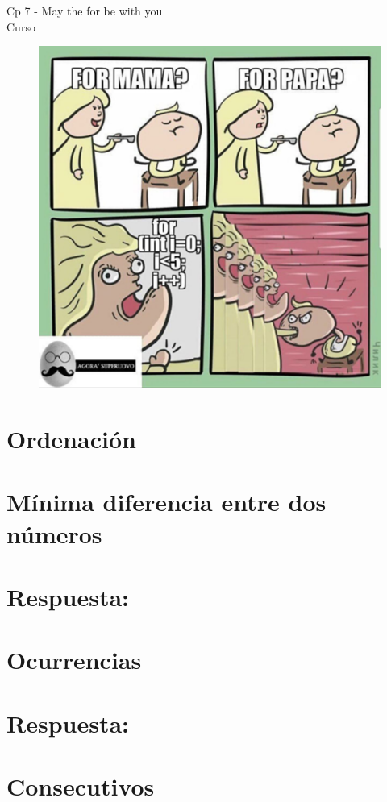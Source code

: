 \begin{center}
    \begin{large}
    Cp 7 - May the for be with you\\
    Curso \academicyear\\
    \end{large}
    \begin{figure}[h]
    	\centering
    	\includegraphics[width=0.4\linewidth]{cp6/loops_2.png}
    \end{figure}
\end{center}

\section{Ordenación}


\section{Mínima diferencia entre dos números}

\ifshowanswers
\section*{Respuesta:}

\fi

\section{Ocurrencias}

\ifshowanswers
\section*{Respuesta:}

\fi

\section{Consecutivos}

\ifshowanswers
